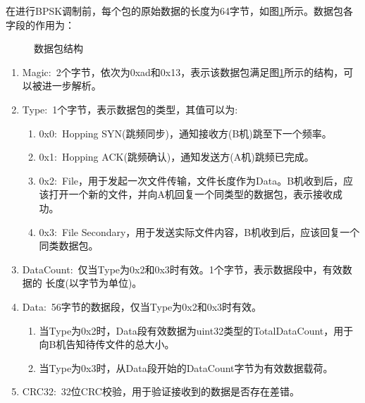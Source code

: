 \documentclass[12pt]{ctexart}
\begin{document}
在进行BPSK调制前，每个包的原始数据的长度为64字节，如图\ref{pack-struc}所示。数据包各字段的作用为：
\begin{figure}[htbp]
	\centering
	\caption{数据包结构}
	\label{pack-struc}
\end{figure}

\begin{enumerate}
	\item[(1) ] Magic:\ 2个字节，依次为0xad和0x13，表示该数据包满足图\ref{pack-struc}所示的结构，可以被进一步解析。
	\item[(2) ] Type:\ 1个字节，表示数据包的类型，其值可以为:
	\begin{enumerate}
		\item 0x0:\ Hopping SYN(跳频同步)，通知接收方(B机)跳至下一个频率。
		\item 0x1:\ Hopping ACK(跳频确认)，通知发送方(A机)跳频已完成。
		\item 0x2:\ File，用于发起一次文件传输，文件长度作为Data。B机收到后，应该打开一个新的文件，并向A机回复一个同类型的数据包，表示接收成功。
		\item 0x3:\ File Secondary，用于发送实际文件内容，B机收到后，应该回复一个同类数据包。
	\end{enumerate}
	\item[(3) ] DataCount:\ 仅当Type为0x2和0x3时有效。1个字节，表示数据段中，有效数据的
	长度(以字节为单位)。
	\item[(4) ] Data:\ 56字节的数据段，仅当Type为0x2和0x3时有效。
		\begin{enumerate}
			\item 当Type为0x2时，Data段有效数据为uint32类型的TotalDataCount，用于向B机告知待传文件的总大小。
			\item 当Type为0x3时，从Data段开始的DataCount字节为有效数据载荷。
		\end{enumerate}
	\item[(5) ] CRC32:\ 32位CRC校验，用于验证接收到的数据是否存在差错。
\end{enumerate}
\end{document}
